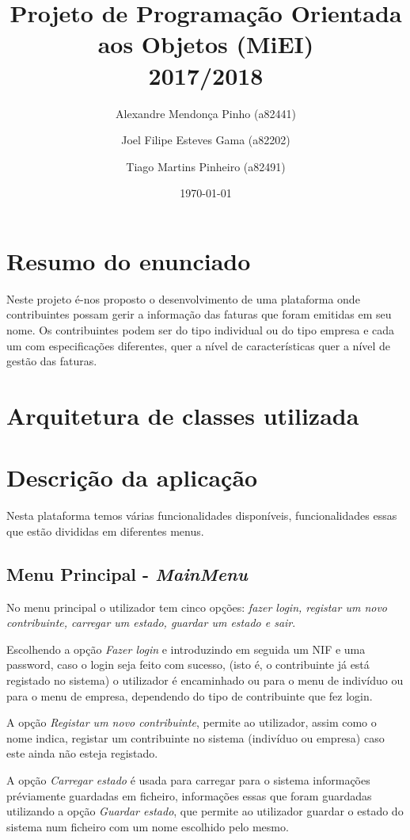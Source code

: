 \documentclass[12pt]{report}
\title{Projeto de Programação Orientada aos Objetos (MiEI) \\ 2017/2018}
\author{Alexandre Mendonça Pinho (a82441) \and Joel Filipe Esteves Gama (a82202) \and Tiago Martins Pinheiro (a82491)}
\date{\today}
\newcommand\tab[1][0.5cm]{\hspace*{#1}}
\begin{document}
\maketitle

\tableofcontents

\chapter{Resumo do enunciado}
\label{sec:resumo}

\tab Neste projeto é-nos proposto o desenvolvimento de uma plataforma onde contribuintes possam gerir a informação das faturas que foram emitidas em seu nome. Os contribuintes podem ser do tipo individual ou do tipo empresa e cada um com especificações diferentes, quer a nível de características quer a nível de gestão das faturas.

\chapter{Arquitetura de classes utilizada}
\label{sec:arquitetura}

\chapter{Descrição da aplicação}
\label{sec:descricao}
\tab Nesta plataforma temos várias funcionalidades disponíveis, funcionalidades essas que estão divididas em diferentes menus.

\section{Menu Principal - \textit{MainMenu}}
\tab No menu principal o utilizador tem cinco opções: \textit{fazer login, registar um novo contribuinte, carregar um estado, guardar um estado e sair}.

Escolhendo a opção \textit{Fazer login} e introduzindo em seguida um NIF e uma password, caso o login seja feito com sucesso, (isto é, o contribuinte já está registado no sistema) o utilizador é encaminhado ou para o menu de indivíduo ou para o menu de empresa, dependendo do tipo de contribuinte que fez login.

A opção \textit{Registar um novo contribuinte}, permite ao utilizador, assim como o nome indica, registar um contribuinte no sistema (indivíduo ou empresa) caso este ainda não esteja registado.

A opção \textit{Carregar estado} é usada para carregar para o sistema informações préviamente guardadas em ficheiro, informações essas que foram guardadas utilizando a opção \textit{Guardar estado}, que permite ao utilizador guardar o estado do sistema num ficheiro com um nome escolhido pelo mesmo.
\end{document}

